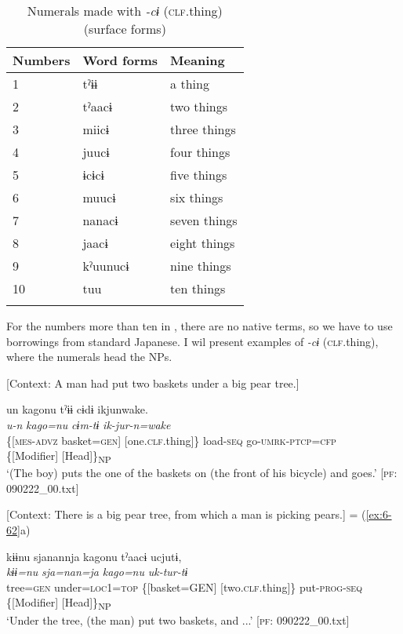 \begin{table}
\caption{\label{tab:key:47} Numerals made with \textit{-cɨ} (\textsc{clf}.thing) (surface forms)}

\begin{tabular}{lll}
\lsptoprule
Numbers  & Word forms  & Meaning\\
\midrule
1 & tˀɨɨ  &a thing\\
2 & tˀaacɨ&  two things     \\
3 & miicɨ & three things    \\
4 & juucɨ & four things     \\
5 & ɨcɨcɨ & five things     \\
6 & muucɨ & six things      \\
7 & nanacɨ&  seven things   \\
8 & jaacɨ & eight things    \\
9 & kˀuunucɨ & nine things  \\
10&  tuu    & ten things    \\
\lspbottomrule
\end{tabular}
\end{table}

For the numbers more than ten in , there are no native terms, so we have to use borrowings from standard Japanese. I wil present examples of \textit{{}-cɨ} (\textsc{clf}.thing), where the numerals head the NPs.

\ea \label{ex:7:12}
\ea \label{ex:7:12a} [Context: A man had put two baskets under a big pear tree.]

{\TM}
\gllll  un  kagonu  tˀɨɨ  cɨdɨ   ikjunwake.\\
\textit{u-n}  \textit{kago=nu}  \textit{}  \textit{cɨm-tɨ} \textit{ik-jur-n=wake}\\
\{[\textsc{mes}-\textsc{advz}  basket=\textsc{gen}]  [one.\textsc{clf}.thing]\}  load-\textsc{seq}          go-\textsc{umrk}-\textsc{ptcp}=\textsc{cfp}\\
\{[Modifier]    [Head]\}\textsubscript{NP}  \\
\glt ‘(The boy) puts the one of the baskets on (the front of his bicycle) and goes.’ [\textsc{pf}: 090222\_00.txt]

\ex \label{ex:7:12b}[Context: There is a big pear tree, from which a man is picking pears.] = (\ref{ex:6-62}a)

  {\TM}
\glll kɨɨnu  sjanannja  kagonu  tˀaacɨ  ucjutɨ,\\
\textit{kɨɨ=nu}  \textit{sja=nan=ja}  \textit{kago=nu}  \textit{}  \textit{uk-tur-tɨ}\\
      tree=\textsc{gen}  under=\textsc{loc}1=\textsc{top}  \{[basket=GEN]  [two.\textsc{clf}.thing]\}   put-\textsc{prog}-\textsc{seq}\\
          \{[Modifier]  [Head]\}\textsubscript{NP}\\
\glt    ‘Under the tree, (the man) put two baskets, and ...’      [\textsc{pf}: 090222\_00.txt]

